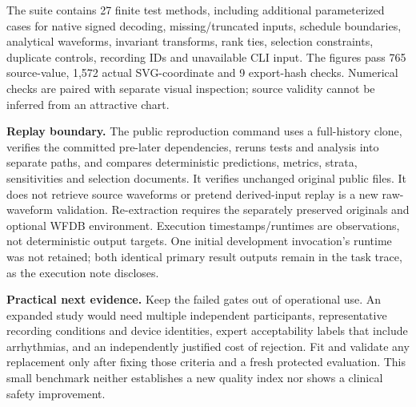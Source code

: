 \documentclass[10pt,letterpaper]{article}
\begin{document}
The suite contains 27 finite test methods, including additional parameterized cases for native signed decoding, missing/truncated inputs, schedule boundaries, analytical waveforms, invariant transforms, rank ties, selection constraints, duplicate controls, recording IDs and unavailable CLI input. The figures pass 765 source-value, 1,572 actual SVG-coordinate and 9 export-hash checks. Numerical checks are paired with separate visual inspection; source validity cannot be inferred from an attractive chart.

\textbf{Replay boundary.} The public reproduction command uses a full-history clone, verifies the committed pre-later dependencies, reruns tests and analysis into separate paths, and compares deterministic predictions, metrics, strata, sensitivities and selection documents. It verifies unchanged original public files. It does not retrieve source waveforms or pretend derived-input replay is a new raw-waveform validation. Re-extraction requires the separately preserved originals and optional WFDB environment. Execution timestamps/runtimes are observations, not deterministic output targets. One initial development invocation's runtime was not retained; both identical primary result outputs remain in the task trace, as the execution note discloses.

\textbf{Practical next evidence.} Keep the failed gates out of operational use. An expanded study would need multiple independent participants, representative recording conditions and device identities, expert acceptability labels that include arrhythmias, and an independently justified cost of rejection. Fit and validate any replacement only after fixing those criteria and a fresh protected evaluation. This small benchmark neither establishes a new quality index nor shows a clinical safety improvement.
\end{document}
